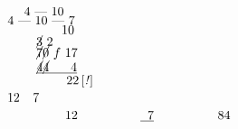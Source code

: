 \begin{minipage}[t]{0.33\textwidth}
$\displaystyle \quad \ 4 \ \mbox{\textemdash} \ 10$\\
%
$\displaystyle 4 \ \mbox{\textemdash} \ 10 \ \mbox{\textemdash} \ 7$\\
%
$\displaystyle \hspace*{15mm} 10$\\
%
$\displaystyle \hspace*{8mm} \cancel{3} \ 2$\\
%
$\displaystyle \hspace*{8mm} \cancel{7}\cancel{0} \ f \ 17$\\
%
$\displaystyle \hspace*{8mm} \underline{\cancel{4}\cancel{4} \hspace*{6mm}4}$\\
%
$\displaystyle \hspace*{14mm}  \ \ 22\, [\mbox{\textit{!}}]\\$
%
\\
%
$\displaystyle 12\\$
%
$\displaystyle \hspace*{2mm} 7\\$
%
\\
%
$\hspace*{16mm}\displaystyle 12\\$
%
$\hspace*{15,8mm}\displaystyle \underline{\hspace*{2mm} 7}\\$
%
$\hspace*{16,2mm}\displaystyle 84$
%
%
\end{minipage}
\pend